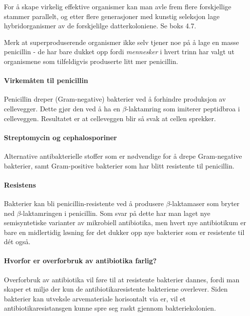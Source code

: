 For å skape virkelig effektive organismer kan man avle frem flere forskjellige stammer parallelt, og etter flere generasjoner med kunstig seleksjon lage hybridorganismer av de forskjelilge datterkoloniene. Se boks 4.7.

Merk at superproduserende organismer ikke selv tjener noe på å lage en masse penicillin - de har bare dukket opp fordi \emph{mennesker} i hvert trinn har valgt ut organismene som tilfeldigvis produserte litt mer penicillin.

\paragraph{Virkemåten til penicillin} Penicillin dreper (Gram-negative) bakterier ved å forhindre produksjon av cellevegger. Dette gjør den ved å ha en $\beta$-laktamring som imiterer peptidbroa i celleveggen. Resultatet er at celleveggen blir så svak at cellen sprekker. 

\paragraph{Streptomycin og cephalosporiner} Alternative antibakterielle stoffer som er nødvendige for å drepe Gram-negative bakterier, samt Gram-positive bakterier som har blitt resistente til penicillin.  

\paragraph{Resistens} Bakterier kan bli penicillin-resistente ved å produsere $\beta$-laktamaser som bryter ned $\beta$-laktamringen i penicillin. Som svar på dette har man laget nye semisyntetiske varianter av mikrobiell antibiotika, men hvert nye antibiotikum er bare en midlertidig løsning før det dukker opp nye bakterier som er resistente til dét også.

\paragraph{Hvorfor er overforbruk av antibiotika farlig?} Overforbruk av antibiotika vil føre til at resistente bakterier dannes, fordi man skaper et miljø der kun de antibiotikaresistente bakteriene overlever. Siden bakterier kan utveksle arvemateriale horisontalt via er, vil et antibiotikaresistansgen kunne spre seg raskt gjennom bakteriekolonien.

